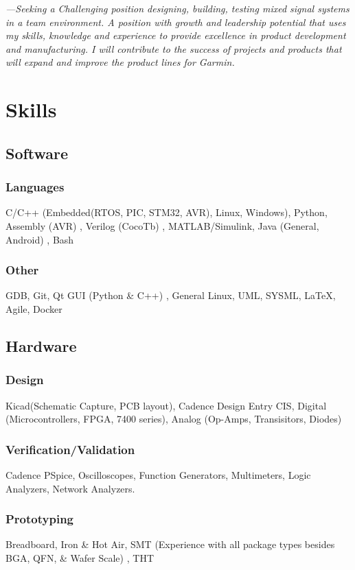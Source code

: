 \documentclass{article}
\begin{document}
\begin{spacing}{.5}

\begin{adjustwidth}{30pt}{30pt}
	\textit{\large{---Seeking a Challenging position designing, building, testing mixed signal systems in a team environment.  A position with growth and leadership potential that uses my skills, knowledge and experience to provide excellence in product development and manufacturing.
	I will contribute to the success of projects and products that will expand and improve the product lines for Garmin.}}
\end{adjustwidth}

\section{Skills}
	\subsection{Software}
		\subsubsection{Languages} \large{C/C++} \small{(Embedded(RTOS, PIC, STM32, AVR), Linux, Windows)}\large{, Python, Assembly} \small{(AVR)} \large{, Verilog} \small{(CocoTb)} \large{, MATLAB/Simulink, Java} \small{(General, Android)} \large{, Bash}
		\subsubsection{Other} \large{GDB, Git, Qt GUI} \small{(Python \& C++)} \large{, General Linux, UML, SYSML, \LaTeX, Agile, Docker}
	\subsection{Hardware}
		\subsubsection{Design} \large{Kicad(Schematic Capture, PCB layout), Cadence Design Entry CIS, Digital} \small{(Microcontrollers, FPGA, 7400 series)}\large{, Analog} \small{(Op-Amps, Transisitors, Diodes)}
		\large{\subsubsection{Verification/Validation} Cadence PSpice, Oscilloscopes, Function Generators, Multimeters, Logic Analyzers, Network Analyzers.}
		\subsubsection{Prototyping} \large{Breadboard, Iron \& Hot Air, SMT} \small{(Experience with all package types besides BGA, QFN, \& Wafer Scale)} \large{, THT}


\end{spacing}
\end{document}
